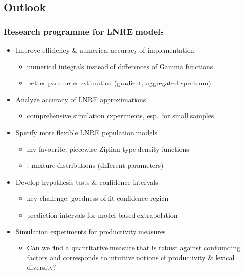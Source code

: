 \documentclass[t]{beamer} %
\begin{document}
\subsection{Outlook}

\begin{frame}[c]
  \frametitle{Research programme for LNRE models}

  \begin{itemize}
  \item Improve efficiency \& numerical accuracy of implementation
    \begin{itemize}
    \item numerical integrals instead of differences of Gamma functions
    \item better parameter estimation (gradient, aggregated spectrum)
    \end{itemize}
  \item Analyze accuracy of LNRE approximations
    \begin{itemize}
    \item comprehensive simulation experiments, esp.\ for small samples
    \end{itemize}
  \item Specify more flexible LNRE population models
    \begin{itemize}
    \item my favourite: piecewise Zipfian type density functions
    \item \citet{Baayen:01}: mixture distributions (different parameters)
    \end{itemize}
  \item Develop hypothesis tests \& confidence intervals
    \begin{itemize}
    \item key challenge: goodness-of-fit \vs confidence region
    \item prediction intervals for model-based extrapolation
    \end{itemize}
  \item Simulation experiments for productivity measures
    \begin{itemize}
    \item Can we find a quantitative measure that is robust against confounding factors and corresponds to intuitive notions of productivity \& lexical diversity?
    \end{itemize}
  \end{itemize}
\end{frame}
\end{document}
